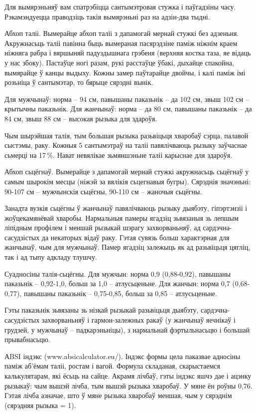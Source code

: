Для вымярэньняў вам спатрэбіцца сантымэтровая стужка і паўгадзіны часу. Рэкамэндуецца праводзіць такія вымярэньні раз на адзін-два тыдні.

Абхоп таліі. Вымерайце абхоп таліі з дапамогай мернай стужкі без адзеньня. Акружнасьць таліі павінна быць вымераная пасярэдзіне паміж ніжнім краем ніжняга рабра і вяршыняй падуздышнага грэбеня (верхняя костка таза, яе відаць у нас збоку). Пастаўце ногі разам, рукі расстаўце ўбакі, дыхайце спакойна, вымярайце ў канцы выдыху. Кожны замер паўтарайце двойчы, і калі паміж імі розьніца ў сантымэтар, то бярыце сярэдні вынік.

Для мужчынаў: норма – 94 см, павышаны паказьнік – да 102 см, звыш 102 см – крытычны паказьнік. Для жанчынаў: норма – да 80 см, павышаны паказьнік – да 84 см, звыш 88 см – высокая рызыка для здароўя.

Чым шырэйшая талія, тым большая рызыка разьвіцьця хваробаў сэрца, палавой сыстэмы, раку. Кожныя 5 сантымэтраў на таліі павялічваюць рызыку заўчаснае сьмерці на 17\,\%. Нават невялікае зьмяншэньне таліі карыснае для здароўя.

Абхоп сьцёгнаў. Вымерайце з дапамогай мернай стужкі акружнасьць сьцёгнаў у самым шырокім месцы (ніжэй за вялікія сьцегнавыя бугры). Сярэднія значэньні: 90-107 см – мужчынскія сьцёгны, 90-110 см – жаночыя сьцёгны.

Занадта вузкія сьцёгны ў жанчынаў павялічваюць рызыку дыябэту, гіпэртэнзіі і жоўцекамянёвай хваробы. Нармальныя памеры ягадзіц зьвязаныя зь лепшым ліпідным профілем і меншай рызыкай шэрагу захворваньняў, ад сардэчна-сасудзістых да некаторых відаў раку. Гэтая сувязь больш характэрная для жанчынаў, чым для мужчынаў. Памер ягадзіц залежыць як ад разьвіцьця цягліц, так і ад тыпу адкладу тлушчу.

Суадносіны талія-сьцёгны. Для мужчын: норма 0,9 (0,88-0,92), павышаны паказьнік – 0,92-1,0, больш за 1,0 – атлусьценьне. Для жанчын: норма 0,7 (0,68-0,77), павышаны паказьнік – 0,75-0,85, больш за 0,85 – атлусьценьне.

Гэты паказьнік зьвязаны зь нізкай рызыкай разьвіцьця дыябэту, сардэчна-сасудзістых захворваньняў і гармон-залежных ракаў (у жанчынаў яечнікаў і грудзей, у мужчынаў – падкарэньніцы), з нармальнай фэртыльнасьцю і большай прывабнасьцю.

АBSI індэкс (www.absicalculator.eu/). Індэкс формы цела паказвае адносіны паміж аб'ёмам таліі, ростам і вагой. Формула складаная, скарыстаемся калькулятарам, які ёсьць на сайце. Акрамя лічбаў, гэты індэкс яшчэ дае і ацэнку рызыкаў: чым вышэй лічба, тым вышэй рызыка хваробаў. У мяне ён роўны 0,76. Гэтая лічба азначае, што ў мяне рызыка хваробаў меншая, чым у сярэднім (сярэдняя рызыка = 1).

